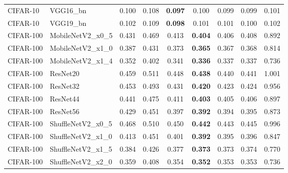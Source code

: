 \begin{table}[h!]
{\begin{tabular}{llccccccc}
 CIFAR-10 &          VGG16\_bn &                  0.100 &        0.108 & \textbf{0.097} &                  0.100 &     0.099 &                  0.099 &       0.101 \\
 CIFAR-10 &          VGG19\_bn &                  0.102 &        0.109 & \textbf{0.098} &                  0.101 &     0.101 &                  0.100 &       0.102 \\
CIFAR-100 &  MobileNetV2\_x0\_5 &                  0.431 &        0.469 &                  0.413 & \textbf{0.404} &     0.406 &                  0.408 &       0.892 \\
CIFAR-100 &  MobileNetV2\_x1\_0 &                  0.387 &        0.431 &                  0.373 & \textbf{0.365} &     0.367 &                  0.368 &       0.814 \\
CIFAR-100 &  MobileNetV2\_x1\_4 &                  0.352 &        0.402 &                  0.341 & \textbf{0.336} &     0.337 &                  0.337 &       0.736 \\
CIFAR-100 &          ResNet20 &                  0.459 &        0.511 &                  0.448 & \textbf{0.438} &     0.440 &                  0.441 &       1.001 \\
CIFAR-100 &          ResNet32 &                  0.453 &        0.493 &                  0.431 & \textbf{0.420} &     0.423 &                  0.424 &       0.956 \\
CIFAR-100 &          ResNet44 &                  0.441 &        0.475 &                  0.411 & \textbf{0.403} &     0.405 &                  0.406 &       0.897 \\
CIFAR-100 &          ResNet56 &                  0.429 &        0.451 &                  0.397 & \textbf{0.392} &     0.394 &                  0.395 &       0.873 \\
CIFAR-100 & ShuffleNetV2\_x0\_5 &                  0.468 &        0.510 &                  0.450 & \textbf{0.442} &     0.443 &                  0.445 &       0.996 \\
CIFAR-100 & ShuffleNetV2\_x1\_0 &                  0.413 &        0.451 &                  0.401 & \textbf{0.392} &     0.395 &                  0.396 &       0.847 \\
CIFAR-100 & ShuffleNetV2\_x1\_5 &                  0.384 &        0.426 &                  0.377 & \textbf{0.373} &     0.373 &                  0.374 &       0.770 \\
CIFAR-100 & ShuffleNetV2\_x2\_0 &                  0.359 &        0.408 &                  0.354 & \textbf{0.352} &     0.353 &                  0.353 &       0.736 \\

\end{tabular}}
\end{table}

